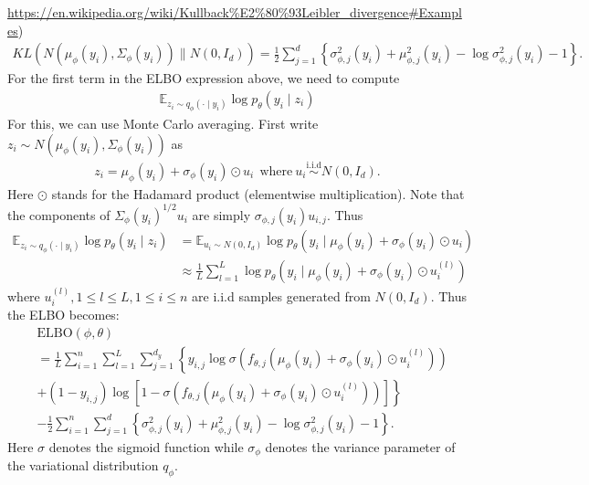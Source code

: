 \documentclass{scrartcl}
\newcommand{\E}{{\mathbb E}}
\begin{document}
\url{https://en.wikipedia.org/wiki/Kullback%E2%80%93Leibler_divergence#Examples})
\begin{align*}
  KL(N(\mu_{\phi}(y_i), \Sigma_{\phi}(y_i))
  \| N(0, I_d)) = \frac{1}{2} \sum_{j=1}^d \left\{\sigma^2_{\phi,
  j}(y_i) + \mu^2_{\phi, j}(y_i) - \log \sigma^2_{\phi, j}(y_i) - 1 \right\}.
\end{align*}
For the first term in the ELBO expression above, we need to compute
\begin{align*}
  \E_{z_i \sim q_{\phi}(\cdot
  \mid y_i)} \log p_{\theta}(y_i \mid z_i)
\end{align*}
For this, we can use Monte Carlo averaging. First write $z_i \sim
N(\mu_{\phi}(y_i), \Sigma_{\phi}(y_i))$ as
\begin{align*}
  z_i = \mu_{\phi}(y_i) + \sigma_{\phi}(y_i) \odot u_i ~~
  \text{where}~ u_i \overset{\text{i.i.d}}{\sim} N(0, I_d). 
\end{align*}
Here $\odot$ stands for the Hadamard product (elementwise
multiplication). Note that the components of $\Sigma_{\phi}(y_i)^{1/2}
u_i$ are simply $\sigma_{\phi, j}(y_i) u_{i, j}$. Thus
\begin{align*}
   \E_{z_i \sim q_{\phi}(\cdot
  \mid y_i)} \log p_{\theta}(y_i \mid z_i) &=     \E_{u_i \sim N(0,
  I_d)} \log p_{\theta}(y_i \mid \mu_{\phi}(y_i) + \sigma_{\phi}(y_i)
                                             \odot u_i)  \\
  &\approx \frac{1}{L} \sum_{l=1}^L \log p_{\theta}(y_i \mid \mu_{\phi}(y_i) + \sigma_{\phi}(y_i)
                                             \odot u_i^{(l)}) 
\end{align*}
where $u_i^{(l)}, 1 \leq l \leq L, 1 \leq i \leq n$ are i.i.d samples
generated from $N(0, I_d)$.  Thus the ELBO becomes:
\begin{align*}
  & \text{ELBO}(\phi, \theta) \\
  &= \frac{1}{L} \sum_{i=1}^n \sum_{l = 1}^L \sum_{j=1}^{d_y}
    \left\{y_{i, j} \log \sigma\left( f_{\theta, j}(\mu_{\phi}(y_i) +
    \sigma_{\phi}(y_i) \odot u_i^{(l)})\right) \right. \\ & \left.+ (1 - y_{i, j}) \log \left[1 -
    \sigma\left( f_{\theta, j}(\mu_{\phi}(y_i) + 
    \sigma_{\phi}(y_i) \odot u_i^{(l)}) \right) 
    \right] \right\} \\
  &- \frac{1}{2} \sum_{i=1}^n \sum_{j=1}^d \left\{\sigma^2_{\phi,
    j}(y_i) + \mu^2_{\phi, j}(y_i) - \log \sigma^2_{\phi, j}(y_i) - 1
    \right\}. 
\end{align*}
Here $\sigma$ denotes the sigmoid function while $\sigma_{\phi}$
denotes the variance parameter of the variational distribution
$q_{\phi}$.
\end{document}
